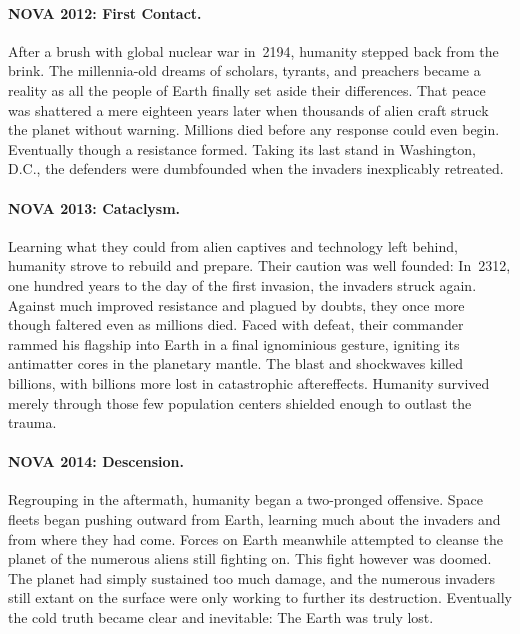\documentclass{novanarrative}
\begin{document}
\paragraph{NOVA 2012: First Contact.}  After a brush with global
nuclear war in~2194, humanity stepped back from the brink.  The
millennia-old dreams of scholars, tyrants, and preachers became a
reality as all the people of Earth finally set aside their
differences.  That peace was shattered a mere eighteen years later
when thousands of alien craft struck the planet without warning.
Millions died before any response could even begin.  Eventually though
a resistance formed.  Taking its last stand in Washington, D.C., the
defenders were dumbfounded when the invaders inexplicably retreated.

\noindent\begin{minipage}[c]{(0.6\linewidth)-1em}%
\paragraph{NOVA 2013: Cataclysm.}  Learning what they could from alien
captives and technology left behind, humanity strove to rebuild and
prepare.  Their caution was well founded: In~2312, one hundred years
to the day of the first invasion, the invaders struck again.  Against
much improved resistance and plagued by doubts, they once more though
faltered even as millions died.  Faced with defeat, their commander
rammed his flagship into Earth in a final ignominious gesture,
igniting its antimatter cores in the planetary mantle.  The blast and
shockwaves killed billions, with billions more lost in catastrophic
aftereffects.  Humanity survived merely through those few population
centers shielded enough to outlast the trauma.

\bigskip
\paragraph{NOVA 2014: Descension.} Regrouping in the aftermath,
humanity began a two-pronged offensive.  Space fleets began pushing
outward from Earth, learning much about the invaders and from where
they had come.  Forces on Earth meanwhile attempted to cleanse the
planet of the numerous aliens still fighting on.  This fight however
was doomed.  The planet had simply sustained too much damage, and the
numerous invaders still extant on the surface were only working to
further its destruction.  Eventually the cold truth became clear and
inevitable: The Earth was truly lost.
\end{minipage}\hfill%
\end{document}
